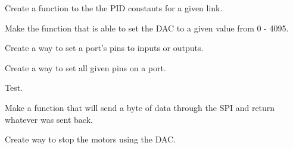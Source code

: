 \begin{DoxyRefList}
\item[\label{todo__todo000017}%
\hypertarget{todo__todo000017}{}%
Global \hyperlink{_p_i_d_8h_a2ffb511c1e18ce767f42422609dfa04d}{set\-Const} (char link, float Kp, float Ki, float Kd)]Create a function to the the P\-I\-D constants for a given link.  
\item[\label{todo__todo000005}%
\hypertarget{todo__todo000005}{}%
Global \hyperlink{_d_a_c_8h_af5aa1a81aa11a072a5ab582d040b3edf}{set\-D\-A\-C} (int D\-A\-Cn, int S\-P\-I\-Val)]Make the function that is able to set the D\-A\-C to a given value from 0 -\/ 4095.  
\item[\label{todo__todo000019}%
\hypertarget{todo__todo000019}{}%
Global \hyperlink{ports_8h_a1b62a36451c75cf20221c12f039ad6f4}{set\-Pins\-Dir} (char port, int dir, char num\-Pins,...)]Create a way to set a port's pins to inputs or outputs.  
\item[\label{todo__todo000021}%
\hypertarget{todo__todo000021}{}%
Global \hyperlink{ports_8h_afd809b04181b31d8567d95f070bb9034}{set\-Pins\-Val} (char port, int val, int num\-Pins,...)]Create a way to set all given pins on a port.  
\item[\label{todo__todo000028}%
\hypertarget{todo__todo000028}{}%
Global \hyperlink{timer_8c_a6c16a31642845dad0390aa67d2462f40}{set\-Timer\-Interrupt} (unsigned char timer, Callback callback)]Test.  
\item[\label{todo__todo000025}%
\hypertarget{todo__todo000025}{}%
Global \hyperlink{_s_p_i_8h_a4d2cd713b65091a59a9a2ee50b28bdf1}{spi\-Transceive} (B\-Y\-T\-E data)]Make a function that will send a byte of data through the S\-P\-I and return whatever was sent back.  
\item[\label{todo__todo000006}%
\hypertarget{todo__todo000006}{}%
Global \hyperlink{motors_8h_a5260da8b51f5d97f6cf2a9ba11d1aee1}{stop\-Motors} ()]Create way to stop the motors using the D\-A\-C. 
\end{DoxyRefList}